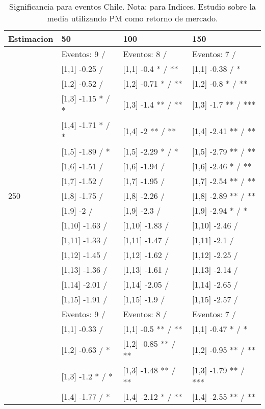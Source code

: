\begin{table}

\caption{Significancia para eventos Chile. Nota: para Indices. Estudio sobre la media utilizando PM como retorno de mercado.}
\centering
\begin{tabular}[t]{llll}
\toprule
Estimacion & 50 & 100 & 150\\
\midrule
 & Eventos:  9 / & Eventos:  8 / & Eventos:  7 /\\
 & {}[1,1] -0.25  / & {}[1,1] -0.4 * / ** & {}[1,1] -0.38  / *\\
 & {}[1,2] -0.52  / & {}[1,2] -0.71 * / ** & {}[1,2] -0.8 * / **\\
 & {}[1,3] -1.15 * / * & {}[1,3] -1.4 ** / ** & {}[1,3] -1.7 ** / ***\\
 & {}[1,4] -1.71 * / * & {}[1,4] -2 ** / ** & {}[1,4] -2.41 ** / **\\
\addlinespace
 & {}[1,5] -1.89  / * & {}[1,5] -2.29 * / * & {}[1,5] -2.79 ** / **\\
 & {}[1,6] -1.51  / & {}[1,6] -1.94  / & {}[1,6] -2.46 * / **\\
 & {}[1,7] -1.52  / & {}[1,7] -1.95  / & {}[1,7] -2.54 ** / **\\
250 & {}[1,8] -1.75  / & {}[1,8] -2.26  / & {}[1,8] -2.89 ** / **\\
 & {}[1,9] -2  / & {}[1,9] -2.3  / & {}[1,9] -2.94 * / *\\
\addlinespace
 & {}[1,10] -1.63  / & {}[1,10] -1.83  / & {}[1,10] -2.46  /\\
 & {}[1,11] -1.33  / & {}[1,11] -1.47  / & {}[1,11] -2.1  /\\
 & {}[1,12] -1.45  / & {}[1,12] -1.62  / & {}[1,12] -2.25  /\\
 & {}[1,13] -1.36  / & {}[1,13] -1.61  / & {}[1,13] -2.14  /\\
 & {}[1,14] -2.01  / & {}[1,14] -2.05  / & {}[1,14] -2.65  /\\
\addlinespace
 & {}[1,15] -1.91  / & {}[1,15] -1.9  / & {}[1,15] -2.57  /\\
 & Eventos:  9 / & Eventos:  8 / & Eventos:  7 /\\
 & {}[1,1] -0.33  / & {}[1,1] -0.5 ** / ** & {}[1,1] -0.47 * / *\\
 & {}[1,2] -0.63  / * & {}[1,2] -0.85 ** / ** & {}[1,2] -0.95 ** / **\\
 & {}[1,3] -1.2 * / * & {}[1,3] -1.48 ** / ** & {}[1,3] -1.79 ** / ***\\
\addlinespace
 & {}[1,4] -1.77  / * & {}[1,4] -2.12 * / ** & {}[1,4] -2.55 ** / **\\

\end{tabular}
\end{table}

